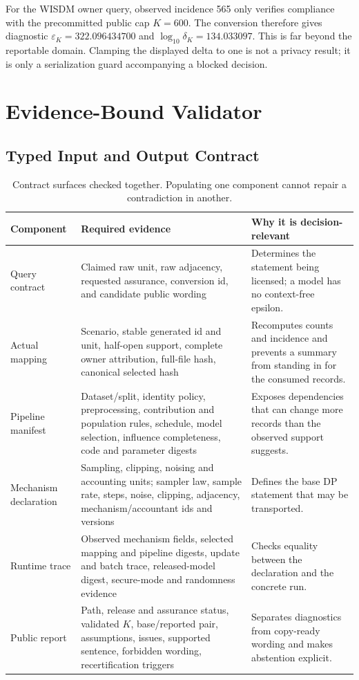 \documentclass[letterpaper]{article} %
\newcommand{\epsK}{\varepsilon_K}
\newcommand{\delK}{\delta_K}
\begin{document}
For the WISDM owner query, observed incidence 565 only verifies compliance
with the precommitted public cap $K=600$.  The conversion therefore gives
diagnostic $\epsK=322.096434700$ and
$\log_{10}\delK=134.033097$.  This is far beyond the reportable domain.
Clamping the displayed delta to one is not a privacy result; it is only a
serialization guard accompanying a blocked decision.

\section{Evidence-Bound Validator}
\label{sec:supp-validator}

\subsection{Typed Input and Output Contract}

\begin{table}[t]
\centering
\small
\setlength{\tabcolsep}{4pt}
\begin{tabular}{p{}p{}p{}}
\toprule
Component & Required evidence & Why it is decision-relevant \\
\midrule
Query contract &
Claimed raw unit, raw adjacency, requested assurance, conversion id, and
candidate public wording &
Determines the statement being licensed; a model has no context-free epsilon.\\
Actual mapping &
Scenario, stable generated id and unit, half-open support, complete owner
attribution, full-file hash, canonical selected hash &
Recomputes counts and incidence and prevents a summary from standing in for
the consumed records.\\
Pipeline manifest &
Dataset/split, identity policy, preprocessing, contribution and population
rules, schedule, model selection, influence completeness, code and parameter
digests &
Exposes dependencies that can change more records than the observed support
suggests.\\
Mechanism declaration &
Sampling, clipping, noising and accounting units; sampler law, sample rate,
steps, noise, clipping, adjacency, mechanism/accountant ids and versions &
Defines the base DP statement that may be transported.\\
Runtime trace &
Observed mechanism fields, selected mapping and pipeline digests, update and
batch trace, released-model digest, secure-mode and randomness evidence &
Checks equality between the declaration and the concrete run.\\
Public report &
Path, release and assurance status, validated $K$, base/reported pair,
assumptions, issues, supported sentence, forbidden wording, recertification
triggers &
Separates diagnostics from copy-ready wording and makes abstention explicit.\\
\bottomrule
\end{tabular}
\caption{Contract surfaces checked together.  Populating one component cannot
repair a contradiction in another.}
\label{tab:supp-contract-fields}
\end{table}
\end{document}
